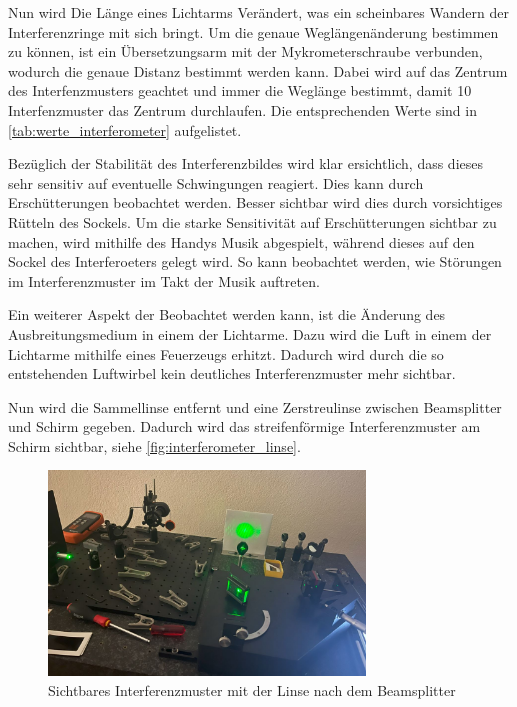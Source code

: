 \documentclass[12pt,english,ngerman]{scrartcl}
\begin{document}
Nun wird Die Länge eines Lichtarms Verändert, was ein scheinbares Wandern der
Interferenzringe mit sich bringt. Um die genaue Weglängenänderung bestimmen zu
können, ist ein Übersetzungsarm mit der Mykrometerschraube verbunden, wodurch
die genaue Distanz bestimmt werden kann. Dabei wird auf das Zentrum des
Interfenzmusters geachtet und immer die Weglänge bestimmt, damit 10
Interfenzmuster das Zentrum durchlaufen. Die entsprechenden Werte sind in
\autoref{tab:werte_interferometer} aufgelistet.


Bezüglich der Stabilität des Interferenzbildes wird klar ersichtlich, dass
dieses sehr sensitiv auf eventuelle Schwingungen reagiert. Dies kann durch
Erschütterungen beobachtet werden. Besser sichtbar wird dies durch vorsichtiges
Rütteln des Sockels. Um die starke Sensitivität auf Erschütterungen sichtbar zu
machen, wird mithilfe des Handys Musik abgespielt, während dieses auf den
Sockel des Interferoeters gelegt wird. So kann beobachtet werden, wie Störungen
im Interferenzmuster im Takt der Musik auftreten.

Ein weiterer Aspekt der Beobachtet werden kann, ist die Änderung des
Ausbreitungsmedium in einem der Lichtarme. Dazu wird die Luft in einem der
Lichtarme mithilfe eines Feuerzeugs erhitzt. Dadurch wird durch die so
entstehenden Luftwirbel kein deutliches Interferenzmuster mehr sichtbar.

Nun wird die Sammellinse entfernt und eine Zerstreulinse zwischen Beamsplitter
und Schirm gegeben. Dadurch wird das streifenförmige Interferenzmuster am
Schirm sichtbar, siehe \autoref{fig:interferometer_linse}.

\begin{figure}[H]
	\begin{center}
		\includegraphics[width =0.75\textwidth]{./figures/Interferometer_linse.JPG}
	\end{center}
	\caption[Sichtbares Interferenzmuster mit der Linse nach dem Beamsplitter] { Sichtbares
		Interferenzmuster mit der Linse nach dem Beamsplitter
	}\label{fig:interferometer_linse}
\end{figure}
\end{document}
